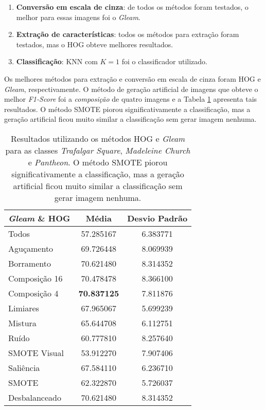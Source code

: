 \begin{enumerate}
\item \textbf{Conversão em escala de cinza}: de todos os métodos foram testados, o melhor para essas imagens foi o \emph{Gleam}.
\item \textbf{Extração de características}: todos os métodos para extração foram testados, mas o HOG obteve melhores resultados.
\item \textbf{Classificação}: KNN com $K=1$ foi o classificador utilizado.
\end{enumerate}


Os melhores métodos para extração e conversão em escala de cinza foram HOG e \emph{Gleam}, respectivamente. O método de geração artificial de imagens que obteve o melhor \textit{F1-Score} foi a \emph{composição} de quatro imagens e a Tabela \ref{tab:resultados:4.2} apresenta tais resultados. O método SMOTE piorou significativamente a classificação, mas a geração artificial ficou muito similar a classificação sem gerar imagem nenhuma.

\begin{table}[!htbp]
\begin{center}
\caption{Resultados utilizando os métodos HOG e \textit{Gleam} para as classes \textit{Trafalgar Square}, \textit{Madeleine Church} e \textit{Pantheon}. O método SMOTE piorou significativamente a classificação, mas a geração artificial ficou muito similar a classificação sem gerar imagem nenhuma.}
\label{tab:resultados:4.2}
\begin{tabular}{|l|c|c|}
\hline
\textbf{\emph{Gleam} \& HOG} & \textbf{Média}     & \textbf{Desvio Padrão} \\ \hline
   Todos        &  57.285167 &  6.383771  \\ \hline
  Aguçamento    &  69.726448 &  8.069939  \\ \hline
  Borramento    &  70.621480 &  8.314352  \\ \hline
  Composição 16 &  70.478478 &  8.366100  \\ \hline
  Composição 4  &  \textbf{70.837125} &  7.811876  \\ \hline
  Limiares      &  67.965067 &  5.699239  \\ \hline
  Mistura       &  65.644708 &  6.112751  \\ \hline
  Ruído         &  60.777810 &  8.257640  \\ \hline
  SMOTE Visual  &  53.912270 &  7.907406  \\ \hline
  Saliência     &  67.584110 &  6.236710  \\ \hline
 SMOTE          &  62.322870 &  5.726037  \\ \hline
Desbalanceado   &  70.621480 &  8.314352  \\ \hline
\end{tabular}
\end{center}
\end{table}

